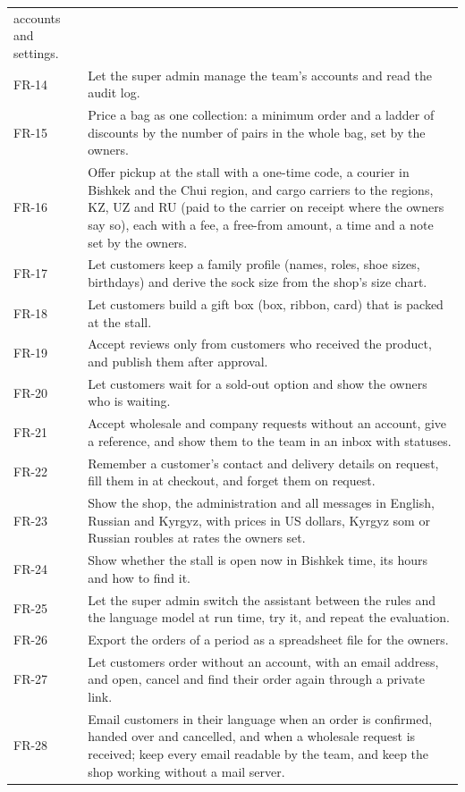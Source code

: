 \begin{longtable}{p{1.4cm} p{12.6cm}}
	accounts and settings. \\
	FR-14 & Let the super admin manage the team's accounts and read the audit log. \\
	FR-15 & Price a bag as one collection: a minimum order and a ladder of discounts by the number of pairs in the whole
	bag, set by the owners. \\
	FR-16 & Offer pickup at the stall with a one-time code, a courier in Bishkek and the Chui region, and cargo carriers
	to the regions, KZ, UZ and RU (paid to the carrier on receipt where the owners say so), each with a fee, a free-from
	amount, a time and a note set by the owners. \\
	FR-17 & Let customers keep a family profile (names, roles, shoe sizes, birthdays) and derive the sock size from the
	shop's size chart. \\
	FR-18 & Let customers build a gift box (box, ribbon, card) that is packed at the stall. \\
	FR-19 & Accept reviews only from customers who received the product, and publish them after approval. \\
	FR-20 & Let customers wait for a sold-out option and show the owners who is waiting. \\
	FR-21 & Accept wholesale and company requests without an account, give a reference, and show them to the team in an
	inbox with statuses. \\
	FR-22 & Remember a customer's contact and delivery details on request, fill them in at checkout, and forget them on
	request. \\
	FR-23 & Show the shop, the administration and all messages in English, Russian and Kyrgyz, with prices in US
	dollars, Kyrgyz som or Russian roubles at rates the owners set. \\
	FR-24 & Show whether the stall is open now in Bishkek time, its hours and how to find it. \\
	FR-25 & Let the super admin switch the assistant between the rules and the language model at run time, try it, and
	repeat the evaluation. \\
	FR-26 & Export the orders of a period as a spreadsheet file for the owners. \\
	FR-27 & Let customers order without an account, with an email address, and open, cancel and find their order again
	through a private link. \\
	FR-28 & Email customers in their language when an order is confirmed, handed over and cancelled, and when a wholesale
	request is received; keep every email readable by the team, and keep the shop working without a mail server. \\

\end{longtable}
